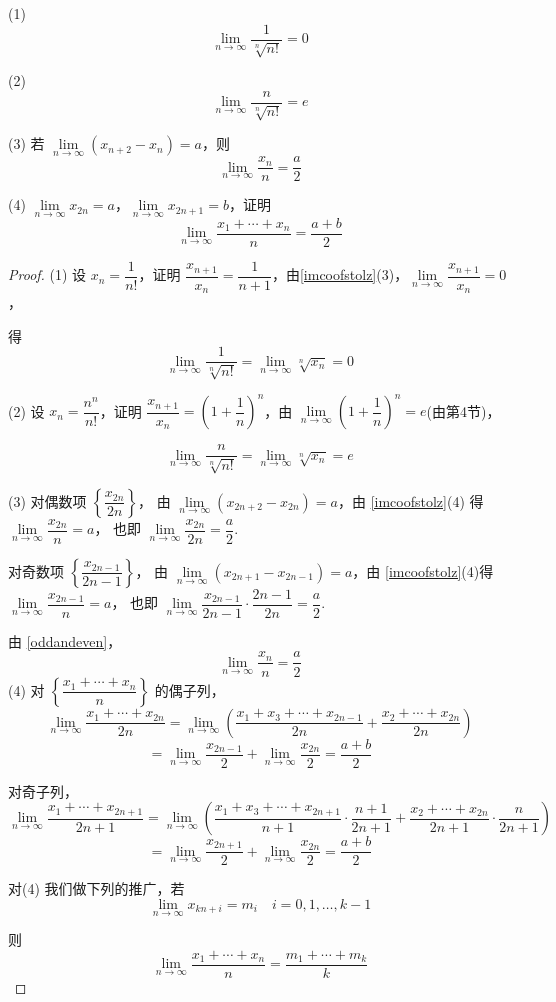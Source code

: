 \begin{example}
	(1)
	$$ \lim_{n \to \infty} \frac{1}{\sqrt[n]{n!}} = 0 $$
	
	(2)
	$$ \lim_{n \to \infty} \frac{n}{\sqrt[n]{n!}} = e $$
	
	(3) 若 $\lim\limits_{n \to \infty} (x_{n+2} - x_n) = a$，则
	$$ \lim_{n \to \infty} \frac{x_n}{n} = \frac{a}{2} $$
	
	(4) $\lim\limits_{n \to \infty} x_{2n} = a$，$\lim\limits_{n \to \infty} x_{2n+1} = b$，证明
	$$ \lim_{n \to \infty} \frac{x_1 + \cdots + x_n}{n} = \frac{a + b}{2} $$
\end{example}
\begin{proof}
	(1) 设 $x_n = \dfrac{1}{n!}$，证明 $\dfrac{x_{n+1}}{x_n} = \dfrac{1}{n+1}$，由\ref{imcoofstolz}(3)，$\lim\limits_{n \to \infty} \dfrac{x_{n+1}}{x_n} = 0$，
	
	得
	\[
	\lim_{n \to \infty} \frac{1}{ \sqrt[n]{n!}} = \lim_{n \to \infty} \sqrt[n]{x_n} = 0
	\]
	
	(2) 设 $x_n = \dfrac{n^n}{n!}$，证明 $\dfrac{x_{n+1}}{x_n} = \left(1 + \dfrac{1}{n}\right)^n$，由 $\lim\limits_{n \to \infty} \left(1 + \dfrac{1}{n}\right)^n = e$(由第4节)，
	
	\[
	\lim_{n \to \infty} \frac{n}{\sqrt[n]{n!}} = \lim_{n \to \infty}  \sqrt[n]{x_n} = e
	\]
	
	(3) 对偶数项 $\left\{ \dfrac{x_{2n}}{2n} \right\}$，
	由 $\lim\limits_{n \to \infty} (x_{2n+2} - x_{2n}) = a$，由 \ref{imcoofstolz}(4) 得 $\lim\limits_{n \to \infty} \dfrac{x_{2n}}{n} = a$，
	也即 $\lim\limits_{n \to \infty} \dfrac{x_{2n}}{2n} = \dfrac{a}{2}$.
	
	对奇数项 $\left\{ \dfrac{x_{2n-1}}{2n-1} \right\}$，
	由 $\lim\limits_{n \to \infty} (x_{2n+1} - x_{2n-1}) = a$，由 \ref{imcoofstolz}(4)得 $\lim\limits_{n \to \infty} \dfrac{x_{2n-1}}{n} = a$，
	也即 $\lim\limits_{n \to \infty} \dfrac{x_{2n-1}}{2n-1} \cdot \dfrac{2n-1}{2n} = \dfrac{a}{2}$.
	
	由 \ref{oddandeven}，
	\[
	\lim_{n \to \infty} \frac{x_n}{n} = \frac{a}{2}
	\]
	(4) 对 $\left\{ \dfrac{x_1 + \cdots + x_n}{n} \right\}$ 的偶子列，
	\[
	\lim_{n \to \infty} \frac{x_1 + \cdots + x_{2n}}{2n} = \lim_{n \to \infty} \left( \frac{x_1 + x_3 + \cdots + x_{2n-1}}{2n} + \frac{x_2 + \cdots + x_{2n}}{2n} \right)
	\]
	\[
	= \lim_{n \to \infty} \frac{x_{2n-1}}{2} + \lim_{n \to \infty} \frac{x_{2n}}{2} = \frac{a + b}{2}
	\]
	
	对奇子列，
	\[
	\lim_{n \to \infty} \frac{x_1 + \cdots + x_{2n+1}}{2n+1} = \lim_{n \to \infty} \left( \frac{x_1 + x_3 + \cdots + x_{2n+1}}{n+1} \cdot \frac{n+1}{2n+1} + \frac{x_2 + \cdots + x_{2n}}{2n+1} \cdot \frac{n}{2n+1} \right)
	\]
	\[
	= \lim_{n \to \infty} \frac{x_{2n+1}}{2} + \lim_{n \to \infty} \frac{x_{2n}}{2} = \frac{a + b}{2}
	\]
	
	对(4) 我们做下列的推广，若
	\[
	\lim_{n \to \infty} x_{kn+i} = m_i \quad i = 0, 1, \ldots, k-1
	\]
	
	则
	\[
	\lim_{n \to \infty} \frac{x_1 + \cdots + x_n}{n} = \frac{m_1 + \cdots + m_k}{k}
	\]
	
\end{proof}

